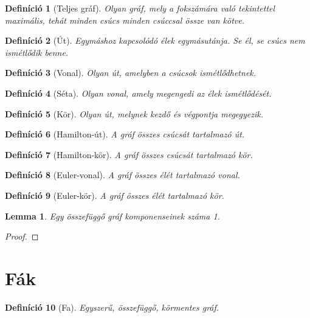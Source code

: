 \documentclass{article}
\newtheorem{definition}{Definíció}
\newtheorem{lemma}{Lemma}
\begin{document}
\begin{definition}[Teljes gráf]
    Olyan gráf, mely a fokszámára való tekintettel maximális, tehát minden csúcs minden csúccsal össze van kötve.
\end{definition}

\begin{definition}[Út]
    Egymáshoz kapcsolódó élek egymásutánja. Se él, se csúcs nem ismétlődik benne.
\end{definition}

\begin{definition}[Vonal]
    Olyan út, amelyben a csúcsok ismétlődhetnek.
\end{definition}

\begin{definition}[Séta]
    Olyan vonal, amely megengedi az élek ismétlődését.
\end{definition}

\begin{definition}[Kör]
    Olyan út, melynek kezdő és végpontja megegyezik.
\end{definition}

\begin{definition}[Hamilton-út]
    A gráf összes csúcsát tartalmazó út.
\end{definition}

\begin{definition}[Hamilton-kör]
    A gráf összes csúcsát tartalmazó kör.
\end{definition}

\begin{definition}[Euler-vonal]
    A gráf összes élét tartalmazó vonal.
\end{definition}

\begin{definition}[Euler-kör]
    A gráf összes élét tartalmazó kör.
\end{definition}

\begin{lemma}
    Egy összefüggő gráf komponenseinek száma 1.
\end{lemma}
\begin{proof}
    
\end{proof}

\section{Fák}
\begin{definition}[Fa]
    Egyszerű, összefüggő, körmentes gráf.
\end{definition}
\end{document}
